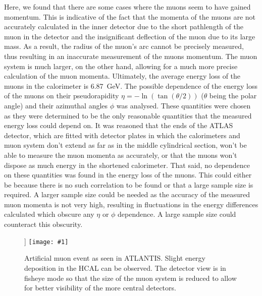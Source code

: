 \documentclass[twocolumn]{article}
\newcommand{\insertFigure}[1]{%
   \texttt{[image: \#1]}%
}
\begin{document}
Here, we found that there are some cases where the muons seem to have gained momentum. This is indicative of the fact that the momenta of the muons are not accurately calculated in the inner detector due to the short pathlength of the muon in the detector and the insignificant deflection of the muon due to its large mass. As a result, the radius of the muon's arc cannot be precisely measured, thus resulting in an inaccurate measurement of the muons momentum. The muon system is much larger, on the other hand, allowing for a much more precise calculation of the muon momenta. Ultimately, the average energy loss of the muons in the calorimeter is 6.87~GeV. The possible dependence of the energy loss of the muons on their pseudorapidity $\eta = -\ln(\tan(\theta/2))$ ($\theta$ being the polar angle) and their azimuthal angles $\phi$ was analysed. These quantities were chosen as they were determined to be the only reasonable quantities that the measured energy loss could depend on. It was reasoned that the ends of the ATLAS detector, which are fitted with detector plates in which the calorimeters and muon system don't extend as far as in the middle cylindrical section, won't be able to measure the muon momenta as accurately, or that the muons won't dispose as much energy in the shortened calorimeter. That said, no dependence on these quantities was found in the energy loss of the muons. This could either be because there is no such correlation to be found or that a large sample size is required. A larger sample size could be needed as the accuracy of the measured muon momenta is not very high, resulting in fluctuations in the energy differences calculated which obscure any $\eta$ or $\phi$ dependence. A large sample size could counteract this obscurity.
\begin{figure} [!h]]
\centering
\insertFigure{Images/Atlantis_Muon_cropped.png}
\caption{Artificial muon event as seen in ATLANTIS. Slight energy deposition in the HCAL can be observed. The detector view is in fisheye mode so that the size of the muon system is reduced to allow for better visibility of the more central detectors.}
\label{fig:muonat}
\end{figure}
\end{document}
